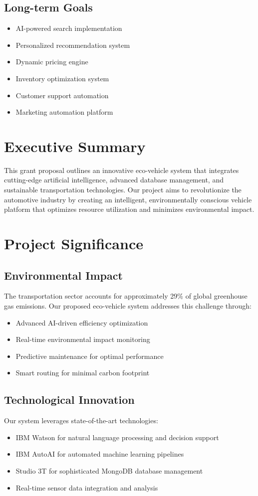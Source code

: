 \documentclass[12pt,a4paper]{article}
\begin{document}
\subsection{Long-term Goals}
\begin{itemize}
    \item AI-powered search implementation
    \item Personalized recommendation system
    \item Dynamic pricing engine
    \item Inventory optimization system
    \item Customer support automation
    \item Marketing automation platform
\end{itemize}

\section{Executive Summary}
This grant proposal outlines an innovative eco-vehicle system that integrates cutting-edge artificial intelligence, advanced database management, and sustainable transportation technologies. Our project aims to revolutionize the automotive industry by creating an intelligent, environmentally conscious vehicle platform that optimizes resource utilization and minimizes environmental impact.

\section{Project Significance}
\subsection{Environmental Impact}
The transportation sector accounts for approximately 29\% of global greenhouse gas emissions. Our proposed eco-vehicle system addresses this challenge through:
\begin{itemize}
    \item Advanced AI-driven efficiency optimization
    \item Real-time environmental impact monitoring
    \item Predictive maintenance for optimal performance
    \item Smart routing for minimal carbon footprint
\end{itemize}

\subsection{Technological Innovation}
Our system leverages state-of-the-art technologies:
\begin{itemize}
    \item IBM Watson for natural language processing and decision support
    \item IBM AutoAI for automated machine learning pipelines
    \item Studio 3T for sophisticated MongoDB database management
    \item Real-time sensor data integration and analysis
\end{itemize}
\end{document}
